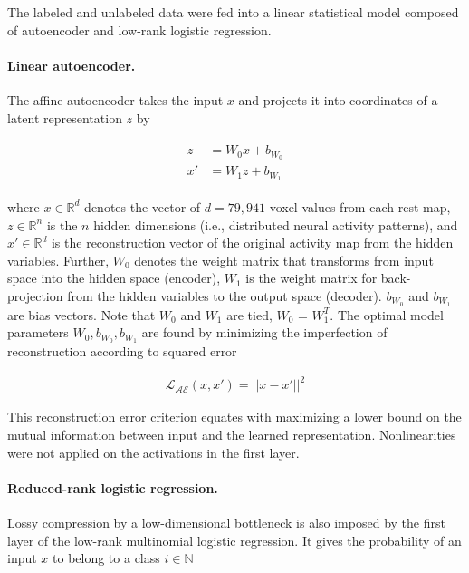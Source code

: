 \documentclass{article} %
\begin{document}
The labeled and unlabeled data were fed into a linear statistical model
composed of autoencoder and low-rank logistic regression.

\paragraph{Linear autoencoder.}
The affine autoencoder takes the input 
$x$ and projects it into coordinates of a latent representation $z$
by

\begin{eqnarray}
  \begin{split}
  z &= W_0 x + b_{W_0} \\
  x' &= W_1 z + b_{W_1}
  \end{split}
  \label{eq:autoenc}
\end{eqnarray}

where $x \in \mathbb{R}^{d}$ denotes the vector of $d=79,941$
voxel values from each
rest map, $z \in \mathbb{R}^{n}$ is the $n$ hidden dimensions (i.e.,
distributed neural activity patterns), and 
$x' \in \mathbb{R}^{d}$ is the reconstruction vector of the original activity map
from the hidden variables. 
Further, ${W_0}$ denotes the weight matrix that
transforms
from input space into the hidden space (encoder),
${W_1}$ is the weight matrix for back-projection from the hidden variables to the
output space (decoder).
${b_{W_0}}$ and ${b_{W_1}}$ are bias vectors.
Note that ${W_0}$ and ${W_1}$ are tied,
$W_0$ = $W_1^T$.
The optimal model parameters ${W_0}, {b_{W_0}}, {b_{W_1}}$ are found by
minimizing the imperfection of reconstruction according to squared error

\begin{eqnarray}
  {\mathcal{L_{AE}}}(x, x') = || x - x' ||^2
\end{eqnarray}

This reconstruction error criterion equates with
maximizing a lower bound on the mutual information between
input and the learned representation.
Nonlinearities were not applied on the
activations in the first layer.

\paragraph{Reduced-rank logistic regression.}
Lossy compression by a low-dimensional bottleneck
is also imposed by the first layer of the low-rank
multinomial logistic regression.
It gives the probability of an input $x$ to belong
to a class $i \in \mathbb{N}$
\end{document}
